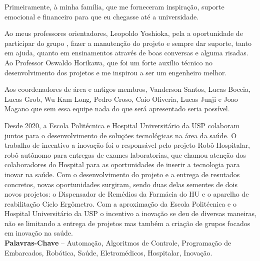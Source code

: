 \documentclass[]{politex}
\begin{document}
\capa
\falsafolhaderosto
\folhaderosto




\begin{agradecimentos}

Primeiramente, à minha família, que me forneceram inspiração, suporte emocional e financeiro para que eu chegasse até a universidade.

Ao meus professores orientadores, Leopoldo Yoshioka, pela a oportunidade de participar do grupo , fazer a manutenção do projeto e sempre dar suporte, tanto em ajuda, quanto em ensinamentos através de boas conversas e alguma risadas. Ao Professor Oswaldo Horikawa, que foi um forte auxílio técnico no desenvolvimento dos projetos e me inspirou a ser um engenheiro melhor.

Aos coordenadores de área e antigos membros, Vanderson Santos, Lucas Boccia, Lucas Grob, Wu Kam Long, Pedro Croso, Caio Oliveria, Lucas Junji e Joao Magano que sem essa equipe nada do que será apresentado seria possível.


\end{agradecimentos}


\begin{resumo}
Desde 2020, a Escola Politécnica e Hospital Universitário da USP colaboram juntos para o desenvolvimento de soluções tecnológicas na área da saúde. O trabalho de incentivo a inovação foi o responsável pelo projeto Robô Hospitalar, robô autônomo para entregas de exames laboratorias, que chamou atenção dos colaboradores do Hospital para as oportunidades de inserir a tecnologia para inovar na saúde. Com o desenvolvimento do projeto e a entrega de resutados concretos, novas oportunidades surgiram, sendo duas delas sementes de dois novos projetos: o Dispensador de Remédios da Farmácia do HU e o aparelho de reabilitação Ciclo Ergômetro. Com a aproximação da Escola Politécnica e o Hospital Universitário da USP o incentivo a inovação se deu de diversas maneiras, não se limitando a entrega de projetos mas também a criação de grupos focados em inovação na saúde.
%
\\[3\baselineskip]
%
\textbf{Palavras-Chave} -- Automação, Algoritmos de Controle, Programação de Embarcados, Robótica, Saúde, Eletromédicos, Hospitalar, Inovação.
\end{resumo}
\end{document}
